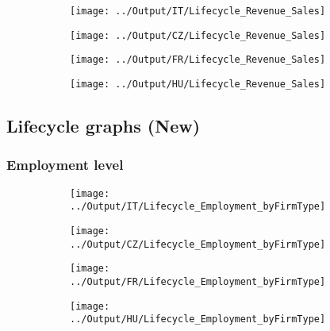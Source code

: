\documentclass[12pt,notitlepage]{article}
\begin{document}
\begin{figure}[!htpb]
\centering
\caption{Firm age and Revenue/Sales}
\begin{subfigure}{.49\textwidth}
    \centering
 \texttt{[image: ../Output/IT/Lifecycle\_Revenue\_Sales]}
\end{subfigure}%
\begin{subfigure}{.49\textwidth}
    \centering
 \texttt{[image: ../Output/CZ/Lifecycle\_Revenue\_Sales]}
\end{subfigure}
\begin{subfigure}{.49\textwidth}
    \centering
 \texttt{[image: ../Output/FR/Lifecycle\_Revenue\_Sales]}
\end{subfigure}%
\begin{subfigure}{.49\textwidth}
    \centering
 \texttt{[image: ../Output/HU/Lifecycle\_Revenue\_Sales]}
\end{subfigure}
\end{figure}
\pagebreak


\subsection{Lifecycle graphs (New)}

\subsubsection{Employment level}
\begin{figure}[!htpb]
\centering
\caption{Employment level (Average)}
\begin{subfigure}{.49\textwidth}
    \centering
 \texttt{[image: ../Output/IT/Lifecycle\_Employment\_byFirmType]}
\end{subfigure}%
\begin{subfigure}{.49\textwidth}
    \centering
 \texttt{[image: ../Output/CZ/Lifecycle\_Employment\_byFirmType]}
\end{subfigure}
\begin{subfigure}{.49\textwidth}
    \centering
 \texttt{[image: ../Output/FR/Lifecycle\_Employment\_byFirmType]}
\end{subfigure}%
\begin{subfigure}{.49\textwidth}
    \centering
 \texttt{[image: ../Output/HU/Lifecycle\_Employment\_byFirmType]}
\end{subfigure}
\end{figure}
\pagebreak
\end{document}

